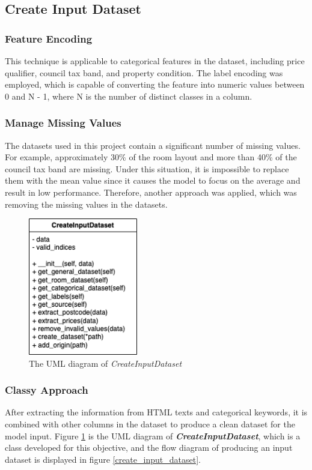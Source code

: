\documentclass[12pt,twoside]{report}
\begin{document}
\subsection{Create Input Dataset}

\subsubsection{Feature Encoding}
This technique is applicable to categorical features in the dataset, including price qualifier, council tax band, and property condition. The label encoding was employed, which is capable of converting the feature into numeric values between 0 and N - 1, where N is the number of distinct classes in a column.

\subsubsection{Manage Missing Values}
The datasets used in this project contain a significant number of missing values. For example, approximately 30\% of the room layout and more than 40\% of the council tax band are missing. Under this situation, it is impossible to replace them with the mean value  since it causes the model to focus on the average and result in low performance. Therefore, another approach was applied, which was removing the missing values in the datasets. 

\begin{figure}[h]
	\centering
	\includegraphics[height=6cm]{uml_create_input_dataset}
	\caption{The UML diagram of \textit{CreateInputDataset}}
	\label{uml_create_input_dataset}
\end{figure}

\subsubsection{Classy Approach}
After extracting the information from HTML texts and categorical keywords, it is combined with other columns in the dataset to produce a clean dataset for the model input.  Figure \ref{uml_create_input_dataset} is the UML diagram of \textit{\textbf{CreateInputDataset}}, which is a class developed for this objective, and the flow diagram of producing an input dataset is displayed in figure \ref{create_input_dataset}.
\end{document}
